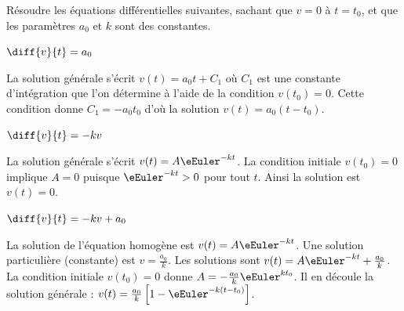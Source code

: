 Résoudre les équations différentielles suivantes, sachant que $v=0$ à $t=t_0$, et que les paramètres $a_0$ et $k$ sont des constantes.

\debutEntrainement


\begin{enonce}
	$\diff{v}{t} =  a_0$
\end{enonce}


\begin{corrige}
La solution générale s'écrit $v(t)=a_0t+C_1$ où $C_1$ est une constante d'intégration que l'on détermine à l'aide de la condition $v(t_0)=0$. Cette condition donne $C_1=-a_0t_0$ d'où la solution $v(t)=a_0(t-t_0)$.
\end{corrige}

\begin{enonce}
	$\diff{v}{t} = -kv$
\end{enonce}


\begin{corrige}
La solution générale s'écrit $v(t) = A\eEuler^{-kt}$. La condition initiale $v(t_0)=0$ implique $A=0$ puisque $\eEuler^{-kt}>0$ pour tout $t$. Ainsi la solution est $v(t)=0$.
\end{corrige}

\begin{enonce}
	$\diff{v}{t} =  -kv+a_0$
\end{enonce}


\begin{corrige}
La solution de l'équation homogène est $v(t) = A\eEuler^{-kt}$. Une solution particulière (constante) est $v = \frac{a_0}{k}$. Les solutions sont  $v(t) = A\eEuler^{-kt}+\frac{a_0}{k}$. La condition initiale $v(t_0)=0$ donne $A=-\frac{a_0}{k}\eEuler^{kt_0}$. Il en découle la solution générale : $v(t) = \frac{a_0}{k}\left[1-\eEuler^{-k(t-t_0)}\right]$.
\end{corrige}

